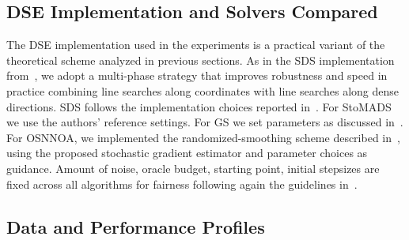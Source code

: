 \documentclass[11pt,a4paper]{article}
\begin{document}
\subsection{DSE Implementation and Solvers Compared}
\label{subsec:impl}

The DSE implementation used in the experiments is a practical variant of the
theoretical scheme analyzed in previous sections.
As in the SDS implementation from~\cite[Section 5]{MR4758401},
we adopt a multi-phase strategy that improves robustness and speed in practice
combining line searches along coordinates with line searches along dense directions.
SDS follows the implementation choices reported in~\cite[Section 5]{MR4758401}.
For StoMADS we use the authors' reference settings. For GS we set parameters as
discussed in~\cite{MR3627456}. For OSNNOA, we implemented the randomized-smoothing
scheme described in~\cite{JMLR:kornowskishamir}, using the proposed stochastic gradient
estimator and parameter choices as guidance.
Amount of noise, oracle budget, starting point, initial stepsizes are fixed across all algorithms for fairness following again the guidelines in~\cite[Section 5]{MR4758401}.

\subsection{Data and Performance Profiles}
\label{subsec:protocol}
\end{document}
